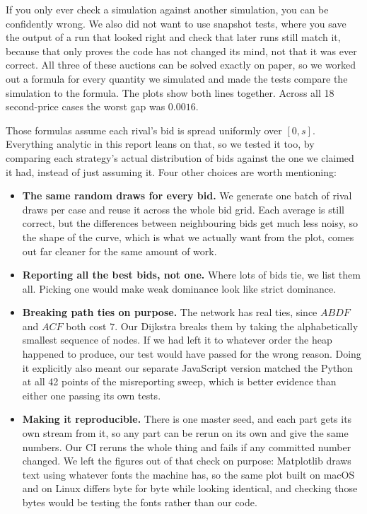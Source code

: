 \documentclass[10pt,a4paper]{article}
\begin{document}
If you only ever check a simulation against another simulation, you can be confidently
wrong. We also did not want to use snapshot tests, where you save the output of a run that
looked right and check that later runs still match it, because that only proves the code
has not changed its mind, not that it was ever correct. All three of these auctions can be
solved exactly on paper, so we worked out a formula for every quantity we simulated and
made the tests compare the simulation to the formula. The plots show both lines together.
Across all 18 second-price cases the worst gap was $0.0016$.

Those formulas assume each rival's bid is spread uniformly over $[0, s]$. Everything
analytic in this report leans on that, so we tested it too, by comparing each strategy's
actual distribution of bids against the one we claimed it had, instead of just assuming it.
Four other choices are worth mentioning:

\begin{itemize}
\itemsep0.1em
\item \textbf{The same random draws for every bid.} We generate one batch of rival draws
per case and reuse it across the whole bid grid. Each average is still correct, but the
differences between neighbouring bids get much less noisy, so the shape of the curve, which
is what we actually want from the plot, comes out far cleaner for the same amount of work.
\item \textbf{Reporting all the best bids, not one.} Where lots of bids tie, we list them
all. Picking one would make weak dominance look like strict dominance.
\item \textbf{Breaking path ties on purpose.} The network has real ties, since $ABDF$ and
$ACF$ both cost $7$. Our Dijkstra breaks them by taking the alphabetically smallest
sequence of nodes. If we had left it to whatever order the heap happened to produce, our
test would have passed for the wrong reason. Doing it explicitly also meant our separate
JavaScript version matched the Python at all 42 points of the misreporting sweep, which is
better evidence than either one passing its own tests.
\item \textbf{Making it reproducible.} There is one master seed, and each part gets its own
stream from it, so any part can be rerun on its own and give the same numbers. Our CI reruns
the whole thing and fails if any committed number changed. We left the figures out of that
check on purpose: Matplotlib draws text using whatever fonts the machine has, so the same
plot built on macOS and on Linux differs byte for byte while looking identical, and checking
those bytes would be testing the fonts rather than our code.
\end{itemize}
\end{document}
